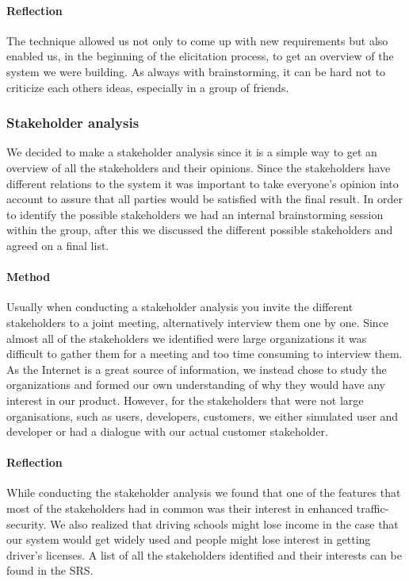 \documentclass[10pt]{article}
\begin{document}
\paragraph{Reflection}
\hfill \break
The technique allowed us not only to come up with new requirements but also enabled us, in the beginning of the elicitation process, to get an overview of the system we were building. As always with brainstorming, it can be hard not to criticize each others ideas, especially in a group of friends.

\subsubsection{Stakeholder analysis}
We decided to make a stakeholder analysis since it is a simple way to get an overview of all the stakeholders and their opinions. Since the stakeholders have different relations to the system it was important to take everyone's opinion into account to assure that all parties would be satisfied with the final result. In order to identify the possible stakeholders we had an internal brainstorming session within the group, after this we discussed the different possible stakeholders and agreed on a final list.

\paragraph{Method}
\hfill \break
Usually when conducting a stakeholder analysis you invite the different stakeholders to a joint meeting, alternatively interview them one by one. Since almost all of the stakeholders we identified were large organizations it was difficult to gather them for a meeting and too time consuming to interview them. As the Internet is a great source of information, we instead chose to study the organizations and formed our own understanding of why they would have any interest in our product. However, for the stakeholders that were not large organisations, such as users, developers, customers, we either simulated user and developer or had a dialogue with our actual customer stakeholder.

\paragraph{Reflection}
\hfill \break
While conducting the stakeholder analysis we found that one of the features that most of the stakeholders had in common was their interest in enhanced traffic-security. We also realized that driving schools might lose income in the case that our system would get widely used and people might lose interest in getting driver's licenses. A list of all the stakeholders identified and their interests can be found in the SRS\cite{srs}. 
\end{document}
